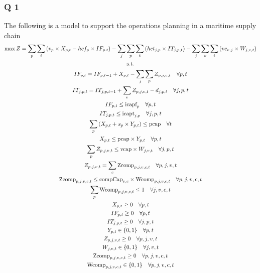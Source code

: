 \documentclass[10pt]{article}
\begin{document}
\subsubsection{Q 1}
The following is a model to support the operations planning in a maritime supply chain 
\begin{gather}
    \max Z = \sum_p\sum_t\left(v_p\times X_{p, t} - hcf_p\times IF_{p. t}\right) - \sum_j\sum_p\sum_t\left(hct_{j, p}\times IT_{j, p, t}\right) - \sum_j\sum_v\sum_t\left(vc_{v, j}\times W_{j, v, t}\right)\notag\\
    \text{s.t.}\notag\\ 
    IF_{p, t} = IF_{p, t - 1} + X_{p, t} - \sum_j\sum_p Z_{p, j, v, t}\quad\forall p, t\\
    IT_{j, p, t} = IT_{j, p, t - 1} + \sum_v Z_{p, j, v, t} - d_{j, p, t}\quad\forall j, p, t\\
    IF_{p, t} \le \text{icapf}_p\quad\forall p, t\\
    IT_{j, p, t} \le \text{icapt}_{j, p}\quad\forall j, p, t\\
    \sum_p\left(X_{p, t} + s_p\times Y_{p, t}\right)\le \text{pcap}\quad\forall t \\ 
    X_{p, t} \le \text{pcap}\times Y_{p, t}\quad\forall p, t\\
    \sum_p Z_{p, j, v, t}\le\text{vcap}\times W_{j, v, t}\quad\forall j, p, t\\
    Z_{p, j, v, t} = \sum_c \text{Zcomp}_{p, j, v, c, t}\quad\forall p, j, v, t\\
    \text{Zcomp}_{p, j, v, c, t}\le \text{compCap}_{v, c}\times \text{Wcomp}_{p, j, v, c, t}\quad\forall p, j, v, c, t\\
    \sum_p \text{Wcomp}_{p, j, v, c, t} \le 1 \quad\forall j, v, c, t\\
    X_{p, t}\ge 0\quad\forall p, t\\
    IF_{p, t}\ge 0\quad\forall p, t\\
    IT_{j, p, t}\ge 0\quad\forall j, p, t\\
    Y_{p, t}\in \{0, 1\}\quad\forall p, t\\
    Z_{p, j, v, t}\ge 0 \quad\forall p, j, v, t\\
    W_{j, v, t}\in \{0, 1\} \quad\forall  j, v, t\\
    \text{Zcomp}_{p, j, v, c, t}\ge 0 \quad\forall p, j, v, c, t\\
    \text{Wcomp}_{p, j, v, c, t}\in \{0, 1\} \quad\forall p, j, v, c, t
\end{gather}
\end{document}
